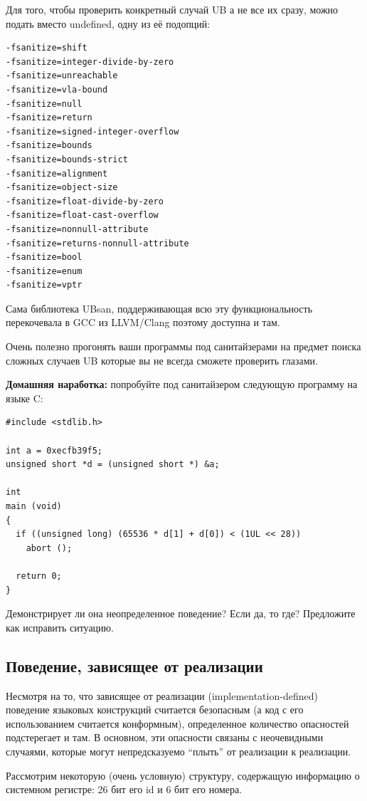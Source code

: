 \documentclass[a4paper,12pt,oneside]{article}
\begin{document}
Для того, чтобы проверить конкретный случай UB а не все их сразу, можно подать вместо undefined, одну из её подопций:

\begin{lstlisting}
-fsanitize=shift
-fsanitize=integer-divide-by-zero
-fsanitize=unreachable
-fsanitize=vla-bound
-fsanitize=null
-fsanitize=return
-fsanitize=signed-integer-overflow
-fsanitize=bounds
-fsanitize=bounds-strict
-fsanitize=alignment
-fsanitize=object-size
-fsanitize=float-divide-by-zero
-fsanitize=float-cast-overflow
-fsanitize=nonnull-attribute
-fsanitize=returns-nonnull-attribute
-fsanitize=bool
-fsanitize=enum
-fsanitize=vptr
\end{lstlisting}

Сама библиотека UBsan, поддерживающая всю эту функциональность перекочевала в GCC из LLVM/Clang поэтому доступна и там.

Очень полезно прогонять ваши программы под санитайзерами на предмет поиска сложных случаев UB которые вы не всегда сможете проверить глазами.

\textbf{Домашняя наработка:} попробуйте под санитайзером следующую программу на языке C:

\begin{lstlisting}
#include <stdlib.h>

int a = 0xecfb39f5;
unsigned short *d = (unsigned short *) &a;

int
main (void)
{
  if ((unsigned long) (65536 * d[1] + d[0]) < (1UL << 28))
    abort ();

  return 0;
}
\end{lstlisting}

Демонстрирует ли она неопределенное поведение? Если да, то где? Предложите как исправить ситуацию.

\subsection{Поведение, зависящее от реализации}\label{ImplementationDefined}

Несмотря на то, что зависящее от реализации (implementation-defined) поведение языковых конструкций считается безопасным (а код с его использованием считается конформным), определенное количество опасностей подстерегает и там. В основном, эти опасности связаны с неочевидными случаями, которые могут непредсказуемо ``плыть'' от реализации к реализации.

Рассмотрим некоторую (очень условную) структуру, содержащую информацию о системном регистре: 26 бит его id и 6 бит его номера.
\end{document}
